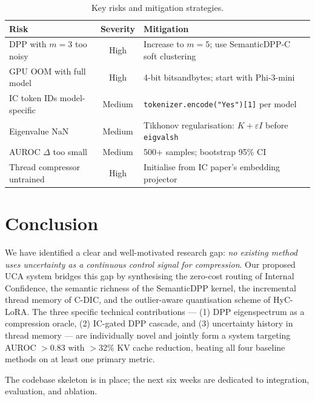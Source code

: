 \documentclass[11pt, a4paper]{article}
\begin{document}
\begin{table}[h]
\centering
\caption{Key risks and mitigation strategies.}
\begin{tabular}{p{4.2cm}cp{5.5cm}}
\toprule
\textbf{Risk} & \textbf{Severity} & \textbf{Mitigation} \\
\midrule
DPP with $m{=}3$ too noisy & High & Increase to $m{=}5$; use SemanticDPP-C soft clustering \\
GPU OOM with full model & High & 4-bit bitsandbytes; start with Phi-3-mini \\
IC token IDs model-specific & Medium & \texttt{tokenizer.encode("Yes")[1]} per model \\
Eigenvalue NaN & Medium & Tikhonov regularisation: $K + \varepsilon I$ before \texttt{eigvalsh} \\
AUROC $\Delta$ too small & Medium & 500+ samples; bootstrap 95\% CI \\
Thread compressor untrained & High & Initialise from IC paper's embedding projector \\
\bottomrule
\end{tabular}
\end{table}

\section{Conclusion}

We have identified a clear and well-motivated research gap: \emph{no existing method uses uncertainty as a continuous control signal for compression}. Our proposed UCA system bridges this gap by synthesising the zero-cost routing of Internal Confidence, the semantic richness of the SemanticDPP kernel, the incremental thread memory of C-DIC, and the outlier-aware quantisation scheme of HyC-LoRA. The three specific technical contributions --- (1) DPP eigenspectrum as a compression oracle, (2) IC-gated DPP cascade, and (3) uncertainty history in thread memory --- are individually novel and jointly form a system targeting AUROC $>$0.83 with $>$32\% KV cache reduction, beating all four baseline methods on at least one primary metric.

The codebase skeleton is in place; the next six weeks are dedicated to integration, evaluation, and ablation.
\end{document}
